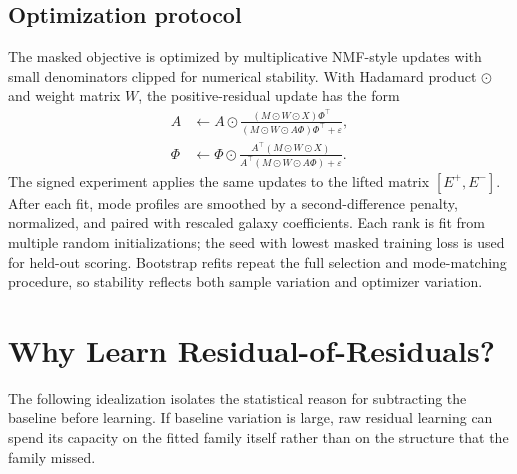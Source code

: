 \documentclass[10pt,twocolumn]{article}
\begin{document}
\subsection{Optimization protocol}

The masked objective is optimized by multiplicative NMF-style updates with
small denominators clipped for numerical stability. With Hadamard product
$\odot$ and weight matrix $W$, the positive-residual update has the form
\begin{align}
A &\leftarrow A\odot
\frac{(M\odot W\odot X)\Phi^\top}
     {(M\odot W\odot A\Phi)\Phi^\top+\varepsilon},\\
\Phi &\leftarrow \Phi\odot
\frac{A^\top(M\odot W\odot X)}
     {A^\top(M\odot W\odot A\Phi)+\varepsilon}.
\end{align}
The signed experiment applies the same updates to the lifted matrix
$[E^+,E^-]$. After each fit, mode profiles are smoothed by a second-difference
penalty, normalized, and paired with rescaled galaxy coefficients. Each rank is
fit from multiple random initializations; the seed with lowest masked training
loss is used for held-out scoring. Bootstrap refits repeat the full selection
and mode-matching procedure, so stability reflects both sample variation and
optimizer variation.

\section{Why Learn Residual-of-Residuals?}

The following idealization isolates the statistical reason for subtracting the
baseline before learning. If baseline variation is large, raw residual learning
can spend its capacity on the fitted family itself rather than on the structure
that the family missed.
\end{document}
